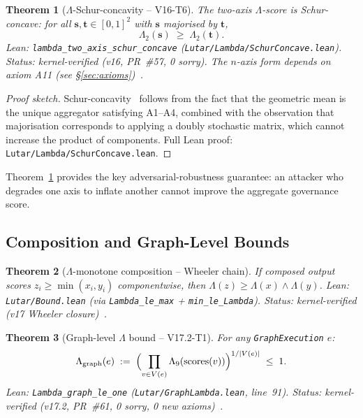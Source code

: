 \documentclass[11pt,letterpaper]{article}
\newtheorem{theorem}{Theorem}[section]
\theoremstyle{definition}
\theoremstyle{remark}
\begin{document}
\begin{theorem}[\(\Lambda\)-Schur-concavity -- V16-T6]
\label{thm:schur}
The two-axis \(\Lambda\)-score is Schur-concave: for all
\(\mathbf{s}, \mathbf{t} \in [0,1]^2\) with \(\mathbf{s}\)
majorised by \(\mathbf{t}\),
\[
  \Lambda_2(\mathbf{s}) \;\ge\; \Lambda_2(\mathbf{t}).
\]
\textup{Lean:} \texttt{lambda\_two\_axis\_schur\_concave}
(\texttt{Lutar/Lambda/SchurConcave.lean}).
Status: kernel-verified (v16, PR~\#57, 0 sorry).
The \(n\)-axis form depends on axiom A11
(see \S\ref{sec:axioms})~\cite{LutarThesisV16}.
\end{theorem}
\begin{proof}[Proof sketch]
Schur-concavity~\cite{HLP1934,MarshallOlkinArnold2011} follows from the
fact that the geometric mean is the unique aggregator satisfying A1--A4,
combined with the observation that majorisation corresponds to applying
a doubly stochastic matrix, which cannot increase the product of
components.
Full Lean proof: \texttt{Lutar/Lambda/SchurConcave.lean}.
\end{proof}

Theorem~\ref{thm:schur} provides the key adversarial-robustness
guarantee: an attacker who degrades one axis to inflate another cannot
improve the aggregate governance score.

\subsection{Composition and Graph-Level Bounds}

\begin{theorem}[\(\Lambda\)-monotone composition -- Wheeler chain]
\label{thm:lambda-comp}
If composed output scores \(z_i \ge \min(x_i, y_i)\) componentwise,
then \(\Lambda(z) \ge \Lambda(x) \wedge \Lambda(y)\).
\textup{Lean:} \texttt{Lutar/Bound.lean} (via \texttt{Lambda\_le\_max} + \texttt{min\_le\_Lambda}).
Status: kernel-verified (v17 Wheeler closure)~\cite{LutarThesisV17}.
\end{theorem}

\begin{theorem}[Graph-level \(\Lambda\) bound -- V17.2-T1]
\label{thm:graph-lambda}
For any \texttt{GraphExecution} \(e\):
\[
  \Lambda_{\mathrm{graph}}(e)
  \;:=\;
  \Bigl(\prod_{v \in V(e)} \Lambda_9(\mathrm{scores}(v))\Bigr)^{1/|V(e)|}
  \;\le\; 1.
\]
\textup{Lean:} \texttt{Lambda\_graph\_le\_one}
(\texttt{Lutar/GraphLambda.lean}, line~91).
Status: kernel-verified (v17.2, PR~\#61, 0 sorry, 0 new
axioms)~\cite{LutarThesisV17}.
\end{theorem}
\end{document}
